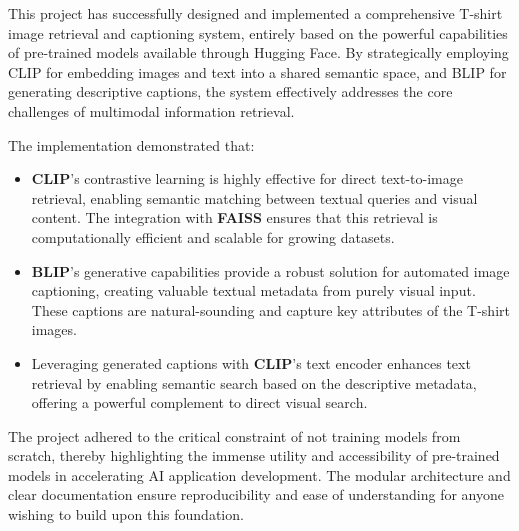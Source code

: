 \documentclass{article}
\begin{document}
This project has successfully designed and implemented a comprehensive T-shirt image retrieval and captioning system, entirely based on the powerful capabilities of pre-trained models available through Hugging Face. By strategically employing CLIP for embedding images and text into a shared semantic space, and BLIP for generating descriptive captions, the system effectively addresses the core challenges of multimodal information retrieval.

The implementation demonstrated that:
\begin{itemize}
    \item \textbf{CLIP}'s contrastive learning is highly effective for direct text-to-image retrieval, enabling semantic matching between textual queries and visual content. The integration with \textbf{FAISS} ensures that this retrieval is computationally efficient and scalable for growing datasets.
    \item \textbf{BLIP}'s generative capabilities provide a robust solution for automated image captioning, creating valuable textual metadata from purely visual input. These captions are natural-sounding and capture key attributes of the T-shirt images.
    \item Leveraging generated captions with \textbf{CLIP}'s text encoder enhances text retrieval by enabling semantic search based on the descriptive metadata, offering a powerful complement to direct visual search.
\end{itemize}
The project adhered to the critical constraint of not training models from scratch, thereby highlighting the immense utility and accessibility of pre-trained models in accelerating AI application development. The modular architecture and clear documentation ensure reproducibility and ease of understanding for anyone wishing to build upon this foundation.
\end{document}
